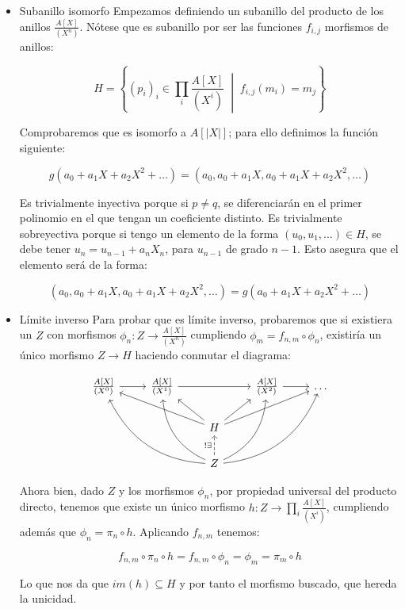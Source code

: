 \documentclass[11pt]{article}
\begin{document}
\begin{itemize}
\item Subanillo isomorfo
\label{sec-7-4-2-1}
Empezamos definiendo un subanillo del producto de los anillos $\frac{A[X]}{(X^n)}$.
Nótese que es subanillo por ser las funciones $f_{i,j}$ morfismos de anillos:

\[
H = \left\{
(p_i)_i \in \prod_i \frac{A[X]}{(X^i)}
\;\middle|\;
f_{i,j}(m_i) = m_j
\right\}
\]

Comprobaremos que es isomorfo a $A[|X|]$; para ello definimos la función
siguiente:

\[
g(a_0+a_1X+a_2X^2+\dots) = (a_0,a_0+a_1X,a_0+a_1X+a_2X^2,\dots)
\]

Es trivialmente inyectiva porque si $p \neq q$, se diferenciarán en el primer
polinomio en el que tengan un coeficiente distinto. Es trivialmente
sobreyectiva porque si tengo un elemento de la forma $(u_0,u_1,\dots) \in H$,
se debe tener $u_n = u_{n-1} + a_n X_n$, para $u_{n-1}$ de grado $n-1$. Esto asegura
que el elemento será de la forma:

\[
(a_0,a_0+a_1X, a_0+a_1X+a_2X^2,\dots) = g(a_0+a_1X+a_2X^2+\dots)
\]

\item Límite inverso
\label{sec-7-4-2-2}
Para probar que es límite inverso, probaremos que si existiera un $Z$ con
morfismos $\phi_n : Z \to \frac{A[X]}{(X^n)}$ cumpliendo $\phi_m = f_{n,m} \circ \phi_n$, existiría un único 
morfismo $Z \to H$ haciendo conmutar el diagrama:

\[\begin{tikzcd}
\frac{A[X]}{(X^0)} \rar &
\frac{A[X]}{(X^1)} \arrow{rr} &&
\frac{A[X]}{(X^2)} \rar &
\dots \\
&&
H \arrow{ull} \ular \urar \arrow{urr}
& & \\
& &
Z
\arrow[bend left]{uull} \arrow[bend left]{uul}
\arrow[bend right]{uurr} \arrow[bend right]{uur}
\uar[dashed]{!\exists}
&&
\end{tikzcd}\]

Ahora bien, dado $Z$ y los morfismos $\phi_n$, por propiedad universal del
producto directo, tenemos que existe un único morfismo $h: Z \to \prod_i \frac{A[X]}{(X^i)}$,
cumpliendo además que $\phi_n = \pi_n \circ h$. Aplicando $f_{n,m}$ tenemos:

\[
f_{n,m} \circ \pi_n \circ h = f_{n,m} \circ \phi_n =
\phi_m = \pi_m\circ h
\]

Lo que nos da que $im(h) \subseteq H$ y por tanto el morfismo buscado, que hereda
la unicidad.
\end{itemize}
\end{document}
